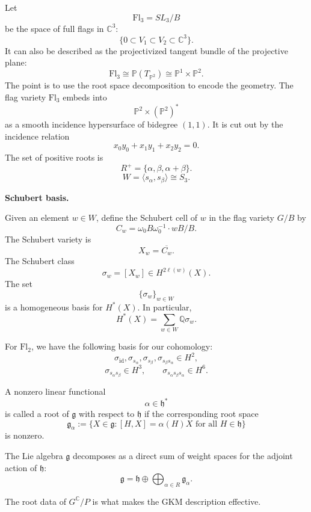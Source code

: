 \begin{example}
\label{example-let-3}
Let
\[
\mathrm{Fl}_3=SL_3/B
\]
be the space of full flags in
\(\mathbb{C}^3\):
\[
\{0\subset V_1\subset V_2\subset
\mathbb{C}^3\}.
\]
It can also be described as the
projectivized tangent bundle of the
projective plane:
\[
\mathrm{Fl}_3\cong \mathbb{P}(T_{\mathbb{
P}^2})
\cong \mathbb{P}^1\times \mathbb{P}^2.
\]
The point is to use the root space
decomposition to encode the geometry.
The flag variety \(\mathrm{Fl}_3\)
embeds into
\[
\mathbb{P}^2\times (\mathbb{P}^2)^*
\]
as a smooth incidence hypersurface of
bidegree \((1,1)\).
It is cut out by the incidence relation
\[
x_0y_0+x_1y_1+x_2y_2=0.
\]
The set of positive roots is
\[
R^+=\{\alpha,\beta,\alpha+\beta\}.
\]
\[
W=\langle s_\alpha,s_\beta\rangle
\cong S_3.
\]
\end{example}

\medskip\noindent
{\bf Schubert basis.}

Given an element $w\in W$, define the
Schubert cell of $w$ in the flag variety
$G/B$ by
\[
C_w=\omega_0 B\omega_0^{-1}\cdot
wB/B.
\]
The Schubert variety is
\[
X_w=\overline{C_w}.
\]
The Schubert class
\[
\sigma_w=[X_w]\in H^{2\ell(w)}(X).
\]
The set
\[
\{\sigma_w\}_{w\in W}
\]
is a homogeneous basis for $H^*(X)$.
In particular,
\[
H^*(X)=\sum_{w\in W}\mathbb{Q}\sigma_w.
\]

\begin{example}
\label{example-2-have}
For \(\mathrm{Fl}_2\), we have the
following basis for our cohomology:
\[
\sigma_{\mathrm{id}},
\sigma_{s_\alpha},
\sigma_{s_\beta},
\sigma_{s_\beta s_\alpha}
\in H^2,
\]
\[
\sigma_{s_\alpha s_\beta}
\in H^3,
\qquad
\sigma_{s_\alpha s_\beta s_\alpha}
\in H^6.
\]
\end{example}

A nonzero linear functional
\[
\alpha\in\mathfrak h^*
\]
is called a root of $\mathfrak g$
with respect to $\mathfrak h$ if the
corresponding root space
\[
\mathfrak g_\alpha:=
\{X\in\mathfrak g:
[H,X]=\alpha(H)X
\text{ for all }H\in\mathfrak h\}
\]
is nonzero.

The Lie algebra $\mathfrak g$
decomposes as a direct sum of weight
spaces for the adjoint action of
\(\mathfrak h\):
\[
\mathfrak g
=
\mathfrak h
\oplus
\bigoplus_{\alpha\in R}
\mathfrak g_\alpha.
\]

\begin{remark}
\label{remark-root-data}
The root data of $G^{\mathbb{C}}/P$
is what makes the GKM description
effective.
\end{remark}

